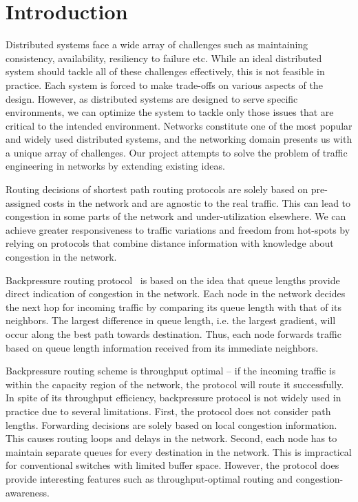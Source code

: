 \label{sec:intro}


\section{Introduction}

Distributed systems face a wide array of challenges such as maintaining consistency, availability, resiliency to failure etc.  While an ideal distributed system should tackle all of these challenges effectively, this is not feasible in practice. Each system is forced to make trade-offs on various aspects of the design. However, as distributed systems are designed to serve specific environments, we can optimize the system to tackle only those issues that are critical to the intended environment. Networks constitute one of the most popular and widely used distributed systems, and the networking domain presents us with a unique array of challenges. Our project attempts to solve the problem of traffic engineering in networks by extending existing ideas.

Routing decisions of shortest path routing protocols are solely based on pre-assigned costs in the network and are agnostic to the real traffic. This can lead to congestion in some parts of the network and under-utilization elsewhere. We can achieve greater responsiveness to traffic variations and freedom from hot-spots by relying on protocols that combine distance information with knowledge about congestion in the network. 

Backpressure routing protocol~\cite{BP-orig} is based on the idea that queue lengths provide direct indication of congestion in the network. Each node in the network decides the next hop for incoming traffic by comparing its queue length with that of its neighbors. The largest difference in queue length, i.e. the largest gradient, will occur along the best path towards destination. Thus, each node forwards traffic based on queue length information received from its immediate neighbors. 

Backpressure routing scheme is throughput optimal -- if the incoming traffic is within the capacity region of the network, the protocol will route it successfully. In spite of its throughput efficiency, backpressure protocol is not widely used in practice due to several limitations. First, the protocol does not consider path lengths. Forwarding decisions are solely based on local congestion information. This causes routing loops and delays in the network. Second, each node has to maintain separate queues for every destination in the network. This is impractical for conventional switches with limited buffer space. However, the protocol does provide interesting features such as throughput-optimal routing and congestion-awareness. 

